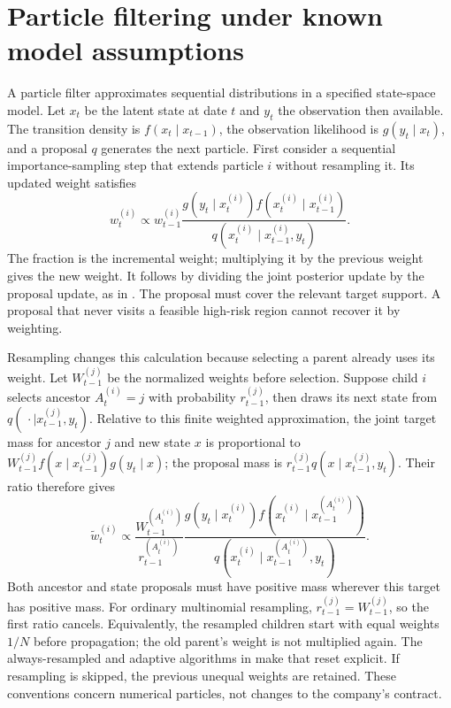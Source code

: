 \section{Particle filtering under known model assumptions}
A particle filter approximates sequential distributions in a specified state-space model. Let $x_t$ be the latent state at date $t$ and $y_t$ the observation then available. The transition density is $f(x_t\mid x_{t-1})$, the observation likelihood is $g(y_t\mid x_t)$, and a proposal $q$ generates the next particle. First consider a sequential importance-sampling step that extends particle $i$ without resampling it. Its updated weight satisfies
\begin{equation}
 w_t^{(i)}\propto w_{t-1}^{(i)}\frac{g(y_t\mid x_t^{(i)})f(x_t^{(i)}\mid x_{t-1}^{(i)})}{q(x_t^{(i)}\mid x_{t-1}^{(i)},y_t)}.
\end{equation}
The fraction is the incremental weight; multiplying it by the previous weight gives the new weight. It follows by dividing the joint posterior update by the proposal update, as in \citet[Section 3.3, equations (29)--(30)]{doucet2012tutorial}. The proposal must cover the relevant target support. A proposal that never visits a feasible high-risk region cannot recover it by weighting.

Resampling changes this calculation because selecting a parent already uses its weight. Let $W_{t-1}^{(j)}$ be the normalized weights before selection. Suppose child $i$ selects ancestor $A_t^{(i)}=j$ with probability $r_{t-1}^{(j)}$, then draws its next state from $q(\,\cdot\mid x_{t-1}^{(j)},y_t)$. Relative to this finite weighted approximation, the joint target mass for ancestor $j$ and new state $x$ is proportional to $W_{t-1}^{(j)} f(x\mid x_{t-1}^{(j)})g(y_t\mid x)$; the proposal mass is $r_{t-1}^{(j)}q(x\mid x_{t-1}^{(j)},y_t)$. Their ratio therefore gives
\begin{equation}
 \widetilde w_t^{(i)}\propto
 \frac{W_{t-1}^{(A_t^{(i)})}}{r_{t-1}^{(A_t^{(i)})}}
 \frac{g(y_t\mid x_t^{(i)})f(x_t^{(i)}\mid x_{t-1}^{(A_t^{(i)})})}
 {q(x_t^{(i)}\mid x_{t-1}^{(A_t^{(i)})},y_t)}.
\end{equation}
Both ancestor and state proposals must have positive mass wherever this target has positive mass. For ordinary multinomial resampling, $r_{t-1}^{(j)}=W_{t-1}^{(j)}$, so the first ratio cancels. Equivalently, the resampled children start with equal weights $1/N$ before propagation; the old parent's weight is not multiplied again. The always-resampled and adaptive algorithms in \citet[Sections 3.4--3.5]{doucet2012tutorial} make that reset explicit. If resampling is skipped, the previous unequal weights are retained. These conventions concern numerical particles, not changes to the company's contract.

